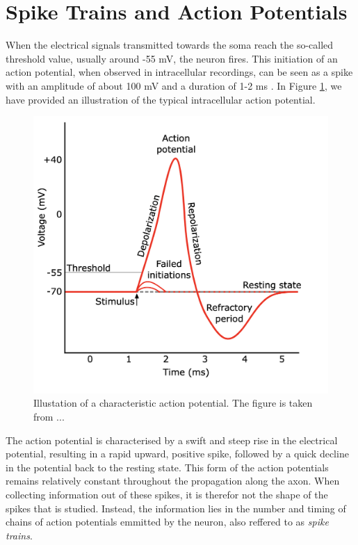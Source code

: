 \documentclass[a4paper, UKenglish, 11pt]{uiomaster}
\begin{document}
\section{Spike Trains and Action Potentials}

When the electrical signals transmitted towards the soma reach the so-called threshold value, usually around -55 mV, the neuron fires. This initiation of an action potential, when observed in intracellular recordings, can be seen as a spike with an amplitude of about 100 mV and a duration of 1-2 ms \cite{gerstner2014neuronal}. In Figure \ref{fig:action_potential}, we have provided an illustration of the typical intracellular action potential.


\begin{figure}
    \centering
    \includegraphics[width=0.8\linewidth]{figures/action_potential.png}
    \caption{Illustation of a characteristic action potential. The figure is taken from ... }
    \label{fig:action_potential}
\end{figure}

The action potential is characterised by a swift and steep rise in the electrical potential, resulting in a rapid upward, positive spike, followed by a quick decline in the potential back to the resting state. This form of the action potentials remains relatively constant throughout the propagation along the axon. When collecting information out of these spikes, it is therefor not the shape of the spikes that is studied. Instead, the information lies in the number and timing of chains of action potentials emmitted by the neuron, also reffered to as \emph{spike trains}.
\end{document}
